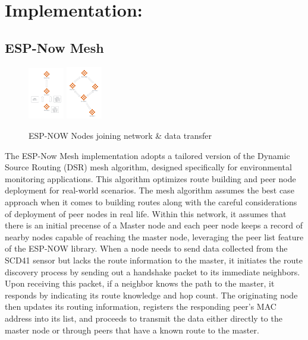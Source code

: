\section*{Implementation:}\label{sec:implementation}

\subsection{ESP-Now Mesh}\label{sec:espnowmesh}
\begin{figure}[H]
  \begin{center}
    \includegraphics[width=0.14\textwidth]{./Figures/ESP-NOW/espnow_join_mesh.png}
    \includegraphics[width=0.14\textwidth]{./Figures/ESP-NOW/espnow_data_transfer.png}
  \end{center}
  \caption{ESP-NOW Nodes joining network \& data transfer}\label{espnow_data_transfer}
\end{figure}

The ESP-Now Mesh implementation adopts a tailored version of the Dynamic Source Routing (DSR) mesh algorithm, designed specifically for environmental monitoring applications. This algorithm optimizes route building and peer node deployment for real-world scenarios. The mesh algorithm assumes the best case approach when it comes to building routes along with the careful considerations of deployment of peer nodes in real life. Within this network, it assumes that there is an initial precense of a Master node and each peer node keeps a record of nearby nodes capable of reaching the master node, leveraging the peer list feature of the ESP-NOW library. When a node needs to send data collected from the SCD41 sensor but lacks the route information to the master, it initiates the route discovery process by sending out a handshake packet to its immediate neighbors. Upon receiving this packet, if a neighbor knows the path to the master, it responds by indicating its route knowledge and hop count. The originating node then updates its routing information, registers the responding peer’s MAC address into its list, and proceeds to transmit the data either directly to the master node or through peers that have a known route to the master. 


